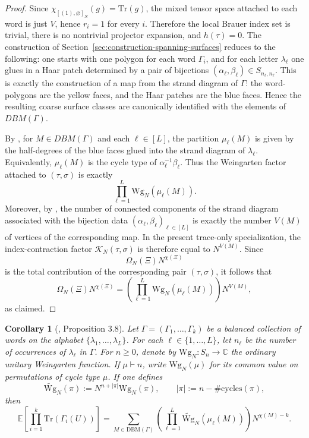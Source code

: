 \documentclass[11pt,a4paper,reqno]{article}
\newtheorem{corollary}[theorem]{Corollary}
\theoremstyle{definition}
\theoremstyle{remark}
\newcommand\Tr{\mathrm{Tr}}
\begin{document}
\begin{proof}
Since $\chi_{[(1),\varnothing]_N}(g)=\Tr(g)$, the mixed tensor space attached to each word is just $V$, hence $r_i=1$ for every $i$. Therefore the local Brauer index set is trivial, there is no nontrivial projector expansion, and $h(\tau)=0$. The construction of Section~\ref{sec:construction-spanning-surfaces} reduces to the following: one starts with one polygon for each word $\Gamma_i$, and for each letter $\lambda_\ell$ one glues in a Haar patch determined by a pair of bijections $(\alpha_\ell,\beta_\ell)\in S_{n_\ell,n_\ell}$. This is exactly the construction of a map from the strand diagram of $\Gamma$: the word-polygons are the yellow faces, and the Haar patches are the blue faces. Hence the resulting coarse surface classes are canonically identified
with the elements of $DBM(\Gamma)$. 

By \cite[Definition 3.5]{CPS25}, for $M\in DBM(\Gamma)$ and each $\ell\in[L]$, the partition $\mu_\ell(M)$ is given by the half-degrees of the blue faces glued into the strand diagram of $\lambda_\ell$. Equivalently, $\mu_\ell(M)$ is the cycle type of $\alpha_\ell^{-1}\beta_\ell$. Thus the Weingarten factor attached to $(\tau,\sigma)$ is exactly
\[
\prod_{\ell=1}^L \mathrm{Wg}_N(\mu_\ell(M)).
\]
Moreover, by \cite[Lemma 3.4]{CPS25}, the number of connected components of the strand diagram associated with the bijection data $(\alpha_\ell,\beta_\ell)_{\ell\in[L]}$ is exactly the number $V(M)$ of vertices of the corresponding map. In the present trace-only specialization, the index-contraction factor $\mathcal K_N(\tau,\sigma)$ is therefore equal to $N^{V(M)}$. Since
\[
\Omega_N(\Xi)N^{\chi(\Xi)}
\]
is the total contribution of the corresponding pair $(\tau,\sigma)$, it follows that
\[
\Omega_N(\Xi)N^{\chi(\Xi)} = \left(\prod_{\ell=1}^L \mathrm{Wg}_N(\mu_\ell(M))\right)N^{V(M)},
\]
as claimed. 
\end{proof}


\begin{corollary}[\cite{CPS25}, Proposition 3.8]\label{cor:cps}
Let $\Gamma=(\Gamma_1,\dots,\Gamma_k)$ be a balanced collection of words on the alphabet $\{\lambda_1,\dots,\lambda_L\}$. For each $\ell\in\{1,\dots,L\}$, let $n_\ell$ be the number of occurrences of $\lambda_\ell$ in $\Gamma$. For $n\ge 0$, denote by $\mathrm{Wg}_{N}:S_n\to\mathbb{C}$ the ordinary unitary Weingarten function. If $\mu\vdash n$, write $\mathrm{Wg}_{N}(\mu)$ for its common value on permutations of cycle type $\mu$. If one defines
\[
\widetilde{\mathrm{Wg}}_{N}(\pi):=
N^{n+|\pi|}\mathrm{Wg}_{N}(\pi),
\qquad
|\pi|:=n-\#\mathrm{cycles}(\pi),
\]
then
\[
\mathbb{E}\left[\prod_{i=1}^k \Tr(\Gamma_i(U))\right]=\sum_{M\in \mathrm{DBM}(\Gamma)}\left(\prod_{\ell=1}^L \widetilde{\mathrm{Wg}}_{N}(\mu_\ell(M))\right)N^{\chi(M)-k}.
\]
\end{corollary}
\end{document}

